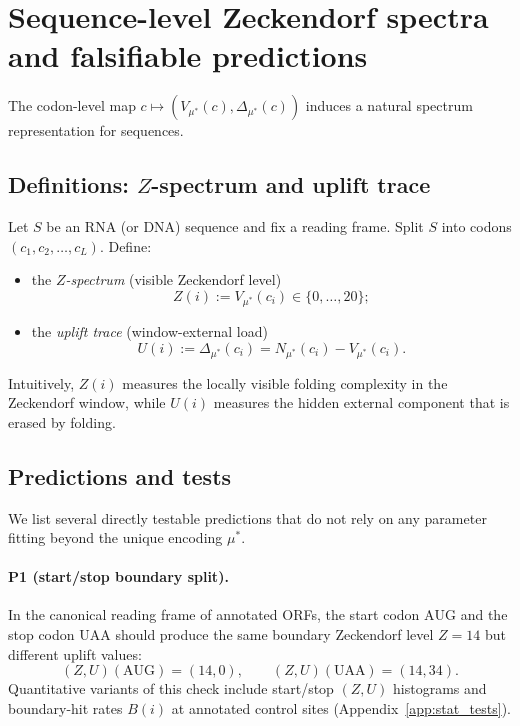 \section{Sequence-level Zeckendorf spectra and falsifiable predictions}
\label{sec:sequence_spectra}

The codon-level map $c\mapsto (V_{\mu^\ast}(c),\Delta_{\mu^\ast}(c))$ induces a natural spectrum representation for sequences.

\subsection{Definitions: \texorpdfstring{$Z$}{Z}-spectrum and uplift trace}
\label{sec:z_u_def}

Let $S$ be an RNA (or DNA) sequence and fix a reading frame.
Split $S$ into codons $(c_1,c_2,\dots,c_L)$.
Define:
\begin{itemize}
\item the \emph{$Z$-spectrum} (visible Zeckendorf level)
\[
Z(i):=V_{\mu^\ast}(c_i)\in\{0,\dots,20\};
\]
\item the \emph{uplift trace} (window-external load)
\[
U(i):=\Delta_{\mu^\ast}(c_i)=N_{\mu^\ast}(c_i)-V_{\mu^\ast}(c_i).
\]
\end{itemize}

Intuitively, $Z(i)$ measures the locally visible folding complexity in the Zeckendorf window, while $U(i)$ measures the hidden external component that is erased by folding.

\subsection{Predictions and tests}
\label{sec:predictions}

We list several directly testable predictions that do not rely on any parameter fitting beyond the unique encoding $\mu^\ast$.

\paragraph{P1 (start/stop boundary split).}
In the canonical reading frame of annotated ORFs, the start codon $\mathrm{AUG}$ and the stop codon $\mathrm{UAA}$ should produce the same boundary Zeckendorf level $Z=14$ but different uplift values:
\[
(Z,U)(\mathrm{AUG})=(14,0),\qquad (Z,U)(\mathrm{UAA})=(14,34).
\]
Quantitative variants of this check include start/stop $(Z,U)$ histograms and boundary-hit rates $B(i)$ at annotated control sites (Appendix~\ref{app:stat_tests}).

